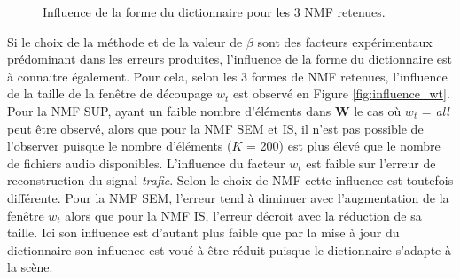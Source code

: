 \begin{figure}[h!]
\centering
{}%
\qquad
{}%
\caption{Influence de la forme du dictionnaire pour les 3 NMF retenues.}
\label{fig:influence_dict}
\end{figure}


Si le choix de la méthode et de la valeur de $\beta$ sont des facteurs expérimentaux prédominant dans les erreurs produites, l'influence de la forme du dictionnaire est à connaitre également. Pour cela, selon les 3 formes de NMF retenues, l'influence de la taille de la fenêtre de découpage $w_t$ est observé en Figure \ref{fig:influence_wt}. Pour la NMF SUP, ayant un faible nombre d'éléments dans $\mathbf{W}$ le cas où $w_t$ = \textit{all} peut être observé, alors que pour la NMF SEM et IS, il n'est pas possible de l'observer puisque le nombre d'éléments ($K$ = 200) est plus élevé que le nombre de fichiers audio disponibles.
L'influence du facteur $w_t$ est faible sur l'erreur de reconstruction du signal \textit{trafic}. Selon le choix de NMF cette influence est toutefois différente. Pour la NMF SEM, l'erreur tend à diminuer avec l'augmentation de la fenêtre $w_t$ alors que pour la NMF IS, l'erreur décroit avec la réduction de sa taille. Ici son influence est d'autant plus faible que par la mise à jour du dictionnaire son influence est voué à être réduit puisque le dictionnaire s'adapte à la scène.

